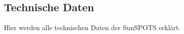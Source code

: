 \subsection{Technische Daten}\label{ss:TechnischeDaten}

Hier werden alle technischen Daten der SunSPOTS erklärt.